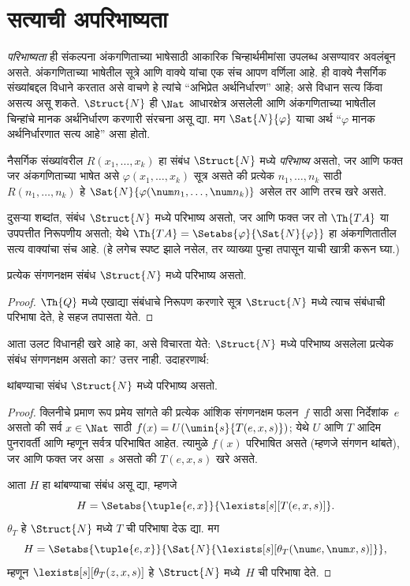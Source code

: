 \section{सत्याची अपरिभाष्यता}\label{inc:inp:tar:sec}

\emph{परिभाष्यता} ही संकल्पना
अंकगणिताच्या भाषेसाठी
आकारिक चिन्हार्थमीमांसा
उपलब्ध असण्यावर
अवलंबून असते.
अंकगणिताच्या भाषेतील
सूत्रे आणि वाक्ये
यांचा एक संच आपण
वर्णिला आहे.
ही वाक्ये नैसर्गिक
संख्यांबद्दल विधाने
करतात असे वाचणे
हे त्यांचे “अभिप्रेत
अर्थनिर्धारण” आहे;
असे विधान सत्य
किंवा असत्य असू
शकते.
$\Struct{N}$ ही
$\Nat$ आधारक्षेत्र
असलेली आणि
अंकगणिताच्या भाषेतील
चिन्हांचे मानक
अर्थनिर्धारण करणारी
संरचना असू द्या.
मग $\Sat{N}{\varphi}$
याचा अर्थ “$\varphi$
मानक अर्थनिर्धारणात
सत्य आहे” असा होतो.

\begin{defn}
नैसर्गिक संख्यांवरील
$R(x_1,\dots,x_k)$ हा
संबंध $\Struct{N}$
मध्ये \emph{परिभाष्य}
असतो, जर आणि फक्त जर
अंकगणिताच्या भाषेत
असे $\varphi(x_1,\dots,x_k)$
सूत्र असते की
प्रत्येक $n_1,\dots,n_k$
साठी $R(n_1,\dots,n_k)$
हे $\Sat{N}{\varphi(\num n_1,\dots,\num
  n_k)}$ असेल
तर आणि तरच खरे असते.
\end{defn}

दुसऱ्या शब्दांत,
संबंध $\Struct{N}$
मध्ये परिभाष्य
असतो, जर आणि फक्त
जर तो $\Th{TA}$
या उपपत्तीत निरूपणीय
असतो; येथे
$\Th{TA} =
\Setabs{\varphi}{\Sat{N}{\varphi}}$
हा अंकगणितातील
सत्य वाक्यांचा
संच आहे.
(हे लगेच स्पष्ट
झाले नसेल, तर
व्याख्या पुन्हा
तपासून याची
खात्री करून घ्या.)

\begin{lem}
प्रत्येक संगणनक्षम
संबंध $\Struct{N}$
मध्ये परिभाष्य
असतो.
\end{lem}

\begin{proof}
$\Th{Q}$ मध्ये
एखाद्या संबंधाचे
निरूपण करणारे
सूत्र $\Struct{N}$
मध्ये त्याच संबंधाची
परिभाषा देते, हे
सहज तपासता येते.
\end{proof}

आता उलट विधानही
खरे आहे का, असे
विचारता येते:
$\Struct{N}$ मध्ये
परिभाष्य असलेला
प्रत्येक संबंध
संगणनक्षम असतो
का? उत्तर नाही.
उदाहरणार्थ:

\begin{lem}
थांबण्याचा संबंध
$\Struct{N}$ मध्ये
परिभाष्य असतो.
\end{lem}

\begin{proof}
क्लिनीचे प्रमाण
रूप प्रमेय सांगते
की प्रत्येक आंशिक
संगणनक्षम फलन~$f$
साठी असा निर्देशांक~$e$
असतो की सर्व
$x \in \Nat$ साठी
$f(x) =
U(\umin{s}{T(e,x,s)})$;
येथे $U$ आणि $T$
आदिम पुनरावर्ती
आणि म्हणून सर्वत्र
परिभाषित आहेत.
त्यामुळे $f(x)$
परिभाषित असते
(म्हणजे संगणन
थांबते), जर आणि
फक्त जर असा~$s$
असतो की $T(e,x,s)$
खरे असते.

आता $H$ हा
थांबण्याचा संबंध
असू द्या, म्हणजे
\[H = \Setabs{\tuple{e,x}}{\lexists[s][T(e, x, s)]}.
\]
$\theta_T$ हे
$\Struct{N}$ मध्ये
$T$ ची परिभाषा
देऊ द्या. मग
\[H = \Setabs{\tuple{e,x}}{\Sat{N}{\lexists[s][\theta_T(\num e, \num x, s)]}},
\]
म्हणून $\lexists[s][\theta_T(z, x, s)]$
हे $\Struct{N}$
मध्ये~$H$ ची
परिभाषा देते.
\end{proof}


